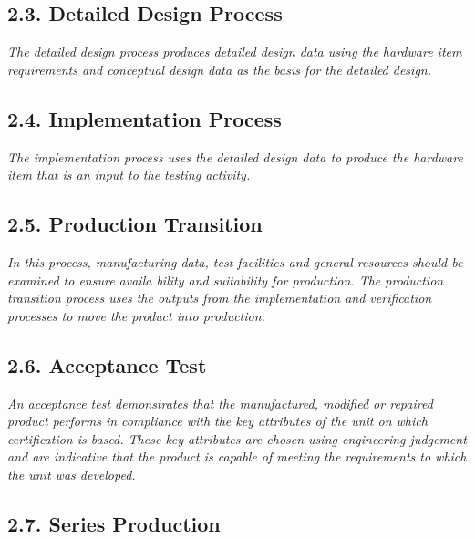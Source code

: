 \documentclass[
]{article}
\begin{document}
\hypertarget{detailed-design-process}{%
\subsection{2.3. Detailed Design
Process}\label{detailed-design-process}}

\emph{The detailed design process produces detailed design data using
the hardware item requirements and conceptual design data as the basis
for the detailed design.}

\hypertarget{implementation-process}{%
\subsection{2.4. Implementation Process}\label{implementation-process}}

\emph{The implementation process uses the detailed design data to
produce the hardware item that is an input to the testing activity.}

\hypertarget{production-transition}{%
\subsection{2.5. Production Transition}\label{production-transition}}

\emph{In this process, manufacturing data, test facilities and general
resources should be examined to ensure availa bility and suitability for
production. The production transition process uses the outputs from the
implementation and verification processes to move the product into
production.}

\hypertarget{acceptance-test}{%
\subsection{2.6. Acceptance Test}\label{acceptance-test}}

\emph{An acceptance test demonstrates that the manufactured, modified or
repaired product performs in compliance with the key attributes of the
unit on which certification is based. These key attributes are chosen
using engineering judgement and are indicative that the product is
capable of meeting the requirements to which the unit was developed.}

\hypertarget{series-production}{%
\subsection{2.7. Series Production}\label{series-production}}
\end{document}
